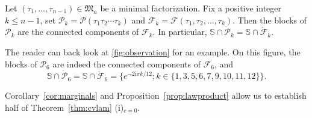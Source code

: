 \documentclass[10pt]{amsart}
\theoremstyle{definition}\newtheorem{defi}[theo]{Definition}\newtheorem{rema}[theo]{Remark}\newtheorem{exam}[theo]{Example}\newtheorem{exem}[theo]{Example}\newtheorem{nota}[theo]{Notation}
\def\S{\mathbb{S}}
\def\PPP{\mathcal P}
\def\FFF{\mathcal F}
\begin{document}
\begin{lemma}
\label{lem:observation}
Let $(\tau_{1}, \ldots, \tau_{n-1}) \in \mathfrak{M}_{n}$ be a minimal factorization.
Fix a positive integer $k \leq n-1$, set  $\PPP_{k}= \PPP(\tau_{1} \tau_{2}\cdots \tau_{k})$ and $ \FFF_{k}=\FFF(\tau_{1} ,\tau_{2} ,\ldots ,\tau_{k})$. Then the blocks of $\PPP_{k}$ are the connected components of $\FFF_{k}$. In particular, $\S \cap \dot{\PPP}_{k}=\S \cap \dot{\FFF}_{k}$.
\end{lemma}

The reader can back look at \cref{fig:observation} for an example.
On this figure, the blocks of $\PPP_{6}$ are indeed the connected components of $\FFF_{6}$,
and  \[\S \cap \dot{\PPP}_{6}=\S \cap \dot{\FFF}_{6} =  \{ e^{- 2 \textrm{i} \pi {k}/{12}}; k \in \{1,3,5,6,7,9,10,11,12\} \}.\]

Corollary~\ref{cor:marginals} and Proposition~\ref{prop:lawproduct} allow us to establish half of Theorem~\ref{thm:cvlam} (i)$_{c=0}$.
\end{document}
